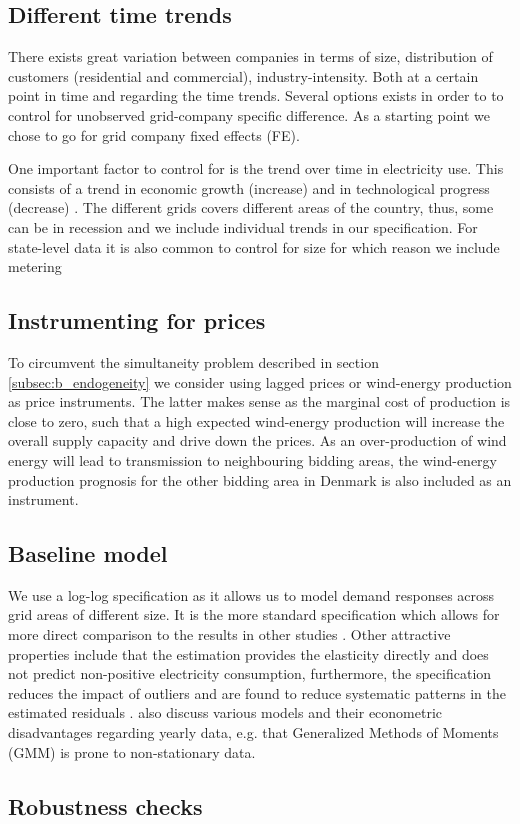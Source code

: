 \label{sec:empirical}
\subsection{Different time trends}
\label{subsec:e_trends}
There exists great variation between companies in terms of size, distribution of customers (residential and commercial), industry-intensity. Both at a certain point in time and regarding the time trends. Several options exists in order to to control for unobserved grid-company specific difference. As a starting point we chose to go for grid company fixed effects (FE).
\par
One important factor to control for is the trend over time in electricity use. This consists of a trend in economic growth (increase) and in technological progress (decrease) \citep{lijesen2007real}. The different grids covers different areas of the country, thus, some can be in recession and we include individual trends in our specification. For state-level data it is also common to control for size \citep{burke2017price} for which reason we include metering


\subsection{Instrumenting for prices}
\label{subsec:instruments}
To circumvent the simultaneity problem described in section \ref{subsec:b_endogeneity} we consider using lagged prices or wind-energy production as price instruments. The latter makes sense as the marginal cost of production is close to zero, such that a high expected wind-energy production will increase the overall supply capacity and drive down the prices. As an over-production of wind energy will lead to transmission to neighbouring bidding areas, the wind-energy production prognosis for the other bidding area in Denmark is also included as an instrument.

\subsection{Baseline model}
\label{subsec:model}
We use a log-log specification as it allows us to model demand responses across grid areas of different size. It is the more standard specification which allows for more direct comparison to the results in other studies \citep{burke2017price}. Other attractive properties include that the estimation provides the elasticity directly and does not predict non-positive electricity consumption, furthermore, the specification reduces the impact of outliers and are found to reduce systematic patterns in the estimated residuals \citep{burke2017price}. \citet{burke2017price}  also discuss various models and their econometric disadvantages regarding yearly data, e.g. that Generalized Methods of Moments (GMM) is prone to non-stationary data.


\subsection{Robustness checks}
\label{subsec:robustness}
